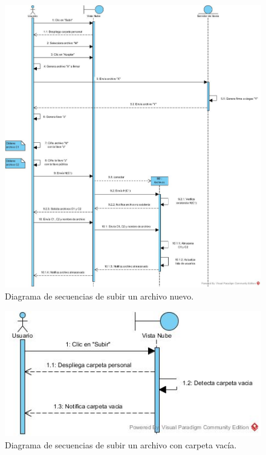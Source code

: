 \begin{figure}[htbp!]
\centering
\includegraphics[width=1\textwidth]{images/Subir_Archivo}
\caption{Diagrama de secuencias de subir un archivo nuevo.}
\end{figure}

\begin{figure}[htbp!]
\centering
\includegraphics[width=1\textwidth]{images/Subir_trayectoria_a}
\caption{Diagrama de secuencias de subir un archivo con carpeta vacía.}
\end{figure}

